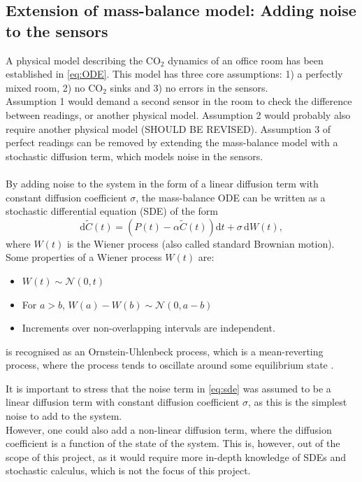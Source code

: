 \subsection{Extension of mass-balance model: Adding noise to the sensors}
A physical model describing the $\text{CO}_2$ dynamics of an office room has been established in \cref{eq:ODE}.
This model has three core assumptions: 1) a perfectly mixed room, 2) no $\text{CO}_2$ sinks and 3) no errors in the sensors.\\
Assumption 1 would demand a second sensor in the room to check the difference between readings, or another physical model.
Assumption 2 would probably also require another physical model (SHOULD BE REVISED). 
Assumption 3 of perfect readings can be removed by extending the mass-balance model with a stochastic diffusion term, which 
models noise in the sensors. \\
\\
By adding noise to the system in the form of a linear diffusion term with constant diffusion coefficient $\sigma$,
the mass-balance ODE can be written as a stochastic differential equation (SDE) of the form
\begin{equation}
    \mathrm{d} \tilde{C}(t) = \left(P(t) - \alpha \tilde{C}(t)\right) \mathrm{d}t + \sigma \, \mathrm{d}W(t),
    \label{eq:sde}
\end{equation}
where $W(t)$ is the Wiener process (also called standard Brownian motion). Some properties of a Wiener process 
$W(t)$ are:
\begin{itemize}
    \item $W(t) \sim \mathcal{N}(0, t)$
    \item For $a > b$, $W(a) - W(b) \sim \mathcal{N}(0, a-b)$ 
    \item Increments over non-overlapping intervals are independent. 
\end{itemize}
 is recognised as an Ornstein-Uhlenbeck process,
which is a mean-reverting process, where the process tends to oscillate
around some equilibrium state \parencite[Sec.~1.13.1]{iacus2008}. \\
\bigskip

It is important to stress that the noise term in \cref{eq:sde} was
assumed to be a linear diffusion term with constant diffusion coefficient $\sigma$,
as this is the simplest noise to add to the system.\\
However, one could also add
a non-linear diffusion term, where the diffusion coefficient is a function of the state of the system.
This is, however, out of the scope of this project, as it would require more
in-depth knowledge of SDEs and stochastic calculus, which is not the focus of this project. 
